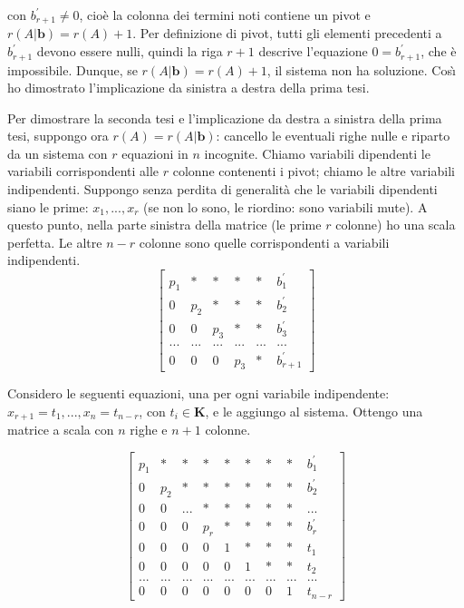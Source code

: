 \documentclass{article}
\begin{document}
con $b_{r+1}^{\prime }\neq 0$, cio\`{e} la colonna dei termini noti contiene
un pivot e $r\left( A|\mathbf{b}\right) =r\left( A\right) +1$. Per
definizione di pivot, tutti gli elementi precedenti a $b_{r+1}^{\prime }$
devono essere nulli, quindi la riga $r+1$ descrive l'equazione $%
0=b_{r+1}^{\prime }$, che \`{e} impossibile. Dunque, se $r\left( A|\mathbf{b}%
\right) =r\left( A\right) +1$, il sistema non ha soluzione. Cos\`{\i} ho
dimostrato l'implicazione da sinistra a destra della prima tesi.

Per dimostrare la seconda tesi e l'implicazione da destra a sinistra della
prima tesi, suppongo ora $r\left( A\right) =r\left( A|\mathbf{b}\right) $:
cancello le eventuali righe nulle e riparto da un sistema con $r$ equazioni
in $n$ incognite. Chiamo variabili dipendenti le variabili corrispondenti
alle $r$ colonne contenenti i pivot; chiamo le altre variabili indipendenti.
Suppongo senza perdita di generalit\`{a} che le variabili dipendenti siano
le prime: $x_{1},...,x_{r}$ (se non lo sono, le riordino: sono variabili
mute). A questo punto, nella parte sinistra della matrice (le prime $r$
colonne) ho una scala perfetta. Le altre $n-r$ colonne sono quelle
corrispondenti a variabili indipendenti.%
\begin{equation*}
\left[ 
\begin{array}{cccccc}
p_{1} & \ast & \ast & \ast & \ast & b_{1}^{\prime } \\ 
0 & p_{2} & \ast & \ast & \ast & b_{2}^{\prime } \\ 
0 & 0 & p_{3} & \ast & \ast & b_{3}^{\prime } \\ 
... & ... & ... & ... & ... & ... \\ 
0 & 0 & 0 & p_{3} & \ast & b_{r+1}^{\prime }%
\end{array}%
\right]
\end{equation*}

Considero le seguenti equazioni, una per ogni variabile indipendente: $%
x_{r+1}=t_{1},...,x_{n}=t_{n-r}$, con $t_{i}\in \mathbf{K}$, e le aggiungo
al sistema. Ottengo una matrice a scala con $n$ righe e $n+1$ colonne.

\begin{equation*}
\left[ 
\begin{array}{ccccccccc}
p_{1} & \ast & \ast & \ast & \ast & \ast & \ast & \ast & b_{1}^{\prime } \\ 
0 & p_{2} & \ast & \ast & \ast & \ast & \ast & \ast & b_{2}^{\prime } \\ 
0 & 0 & ... & \ast & \ast & \ast & \ast & \ast & ... \\ 
0 & 0 & 0 & p_{r} & \ast & \ast & \ast & \ast & b_{r}^{\prime } \\ 
0 & 0 & 0 & 0 & 1 & \ast & \ast & \ast & t_{1} \\ 
0 & 0 & 0 & 0 & 0 & 1 & \ast & \ast & t_{2} \\ 
... & ... & ... & ... & ... & ... & ... & ... & ... \\ 
0 & 0 & 0 & 0 & 0 & 0 & 0 & 1 & t_{n-r}%
\end{array}%
\right]
\end{equation*}
\end{document}
